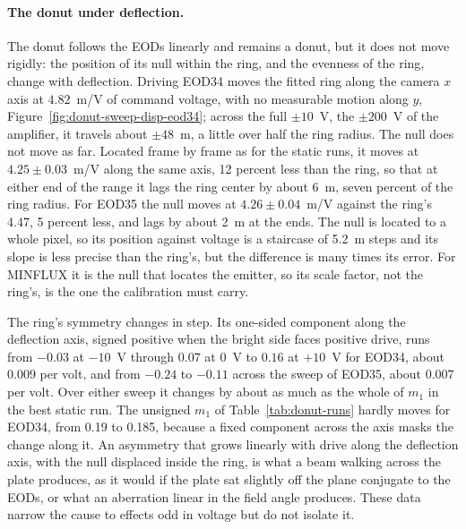 \documentclass{article}
\begin{document}
\paragraph{The donut under deflection.}
The donut follows the EODs linearly and remains a donut, but it does not move rigidly: the
position of its null within the ring, and the evenness of the ring, change with deflection.
Driving EOD34 moves the fitted ring along the camera $x$ axis at $4.82$~\textmu m/V of command
voltage, with no measurable motion along $y$, Figure~\ref{fig:donut-sweep-disp-eod34}; across the
full $\pm10$~V, the $\pm200$~V of the amplifier, it travels about $\pm48$~\textmu m, a little over
half the ring radius. The null does not move as far. Located frame by frame as for the static
runs, it moves at $4.25\pm0.03$~\textmu m/V along the same axis, 12 percent less than the ring, so
that at either end of the range it lags the ring center by about 6~\textmu m, seven percent of the
ring radius. For EOD35 the null moves at $4.26\pm0.04$~\textmu m/V against the ring's 4.47,
5 percent less, and lags by about 2~\textmu m at the ends. The null is located to a whole pixel, so
its position against voltage is a staircase of 5.2~\textmu m steps and its slope is less precise
than the ring's, but the difference is many times its error. For MINFLUX it is the null that
locates the emitter, so its scale factor, not the ring's, is the one the calibration must carry.

The ring's symmetry changes in step. Its one-sided component along the deflection axis, signed
positive when the bright side faces positive drive, runs from $-0.03$ at $-10$~V through $0.07$
at 0~V to $0.16$ at $+10$~V for EOD34, about 0.009 per volt, and from $-0.24$ to $-0.11$ across
the sweep of EOD35, about 0.007 per volt. Over either sweep it changes by about as much as the
whole of $m_1$ in the best static run. The unsigned $m_1$ of Table~\ref{tab:donut-runs} hardly
moves for EOD34, from 0.19 to 0.185, because a fixed component across the axis masks the change
along it. An asymmetry that grows linearly with drive along the deflection axis, with the null
displaced inside the ring, is what a beam walking across the plate produces, as it would if the
plate sat slightly off the plane conjugate to the EODs, or what an aberration linear in the
field angle produces. These data narrow the cause to effects odd in voltage but do not isolate it.
\end{document}
